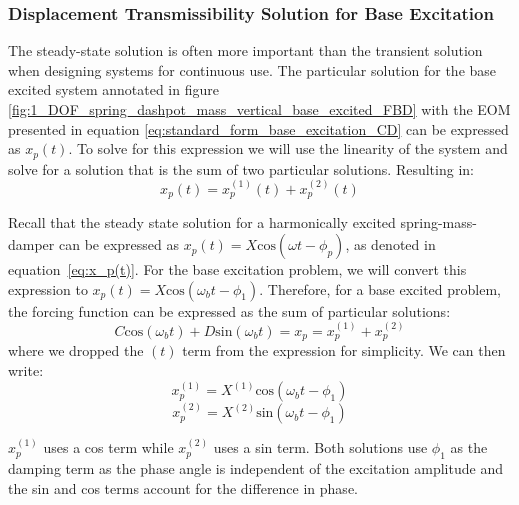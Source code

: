 \documentclass[12pt,letter]{article}
\begin{document}
	\subsubsection{Displacement Transmissibility Solution for Base Excitation}
		The steady-state solution is often more important than the transient solution when designing systems for continuous use. The particular solution for the base excited system annotated in figure \ref{fig:1_DOF_spring_dashpot_mass_vertical_base_excited_FBD} with the EOM presented in equation \ref{eq:standard_form_base_excitation_CD} can be expressed as $	x_p(t)$. To solve for this expression we will use the linearity of the system and solve for a solution that is the sum of two particular solutions. Resulting in:
		\begin{equation}
 x_p(t) = 	x_p^{(1)}(t) + 	x_p^{(2)}(t)  
		\end{equation}
		
 Recall that the steady state solution for a harmonically excited spring-mass-damper can be expressed as $x_p(t) = X\text{cos}(\omega t - \phi_p)$, as denoted in equation~\ref{eq:x_p(t)}. For the base excitation problem, we will convert this expression to $x_p(t) = X\text{cos}(\omega_b t - \phi_1)$. Therefore, for a base excited problem, the forcing function can be expressed as the sum of particular solutions:
		\begin{equation}
			C \text{cos}(\omega_b t)  + D \text{sin}(\omega_b t)   = x_p = 	x_p^{(1)} + 	x_p^{(2)} 
		\end{equation}
		where we dropped the $(t)$ term from the expression for simplicity. We can then write:
		\begin{equation}
			x_p^{(1)} = X^{(1)}\text{cos}(\omega_b t - \phi_1)
		\end{equation}
		\begin{equation}
			x_p^{(2)} = X^{(2)} \text{sin}(\omega_b t - \phi_1)
		\end{equation}
	
		\begin{note}
		$x_p^{(1)}$ uses a cos term while $x_p^{(2)}$ uses a sin term. Both solutions use $\phi_1$ as the damping term as the phase angle is independent of the excitation amplitude and the sin and cos terms account for the difference in phase. 
		\end{note}
\end{document}
